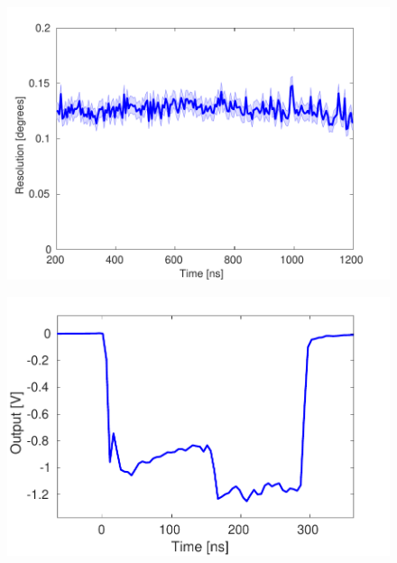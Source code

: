 \documentclass[%
 reprint,
 superscriptaddress,
 amsmath,
 amssymb,
 prstab,
]{revtex4-1}
\begin{document}
\begin{figure}
	\includegraphics[width=\columnwidth]{figs/hw/phMonRes}%
	\caption{\label{f:phMonRes}
	}
\end{figure}

\begin{figure}
	\includegraphics[width=\columnwidth]{figs/hw/phMonBw}%
	\caption{\label{f:phMonBw}
	}
\end{figure}
\end{document}
